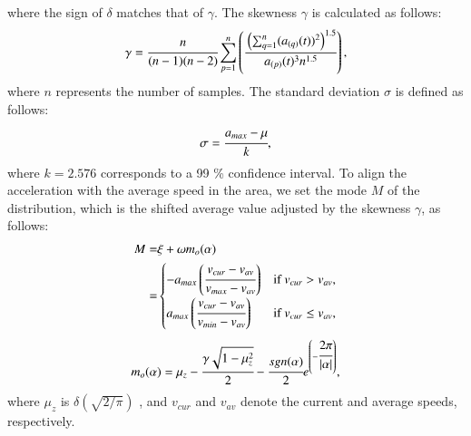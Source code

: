 \documentclass{aims}
\numberwithin{equation}{section}
\begin{document}
where the sign of $\delta$ matches that of $\gamma$.
The skewness $\gamma$ is calculated as follows:
\begin{equation}
        \gamma = \cfrac{n}{(n-1)(n-2)} \sum^{n}_{p=1}\left( \cfrac{\left(\sum^{n}_{q=1}(a_{(q)}(t))^{2} \right)^{1.5}}{a_{(p)}(t)^{3}n^{1.5}} \right),
\end{equation}
where $n$ represents the number of samples.
The standard deviation $\sigma$ is defined as follows:
\begin{equation}
    \sigma = \cfrac{a_{max}-\mu}{k},
\end{equation}
where $k=2.576$ corresponds to a 99 \% confidence interval.
To align the acceleration with the average speed in the area, we set the mode $M$ of the distribution, which is the shifted average value adjusted by the skewness $\gamma$, as follows:\begin{equation}
    \begin{split}
        M=&\xi+\omega m_o(\alpha) \\
         =& \begin{cases}
            - a_{max}\left( \cfrac{v_{cur}-v_{av}}{v_{max}-v_{av}}\right) & \text{if } v_{cur} > v_{av}, \\
            a_{max}\left( \cfrac{v_{cur}-v_{av}}{v_{min}-v_{av}}\right) & \text{if } v_{cur} \leq v_{av},
            \end{cases}
    \end{split}
\end{equation}
\begin{equation}
    m_o(\alpha) = \mu_{z} - \cfrac{\gamma\sqrt{1-\mu_{z}^{2}}}{2} - \cfrac{sgn(\alpha)}{2} e^{\left(-\cfrac{2\pi}{|\alpha|}\right)},
\end{equation}
where $\mu_{z}$ is $\delta(\sqrt{2/\pi})$ \cite{Azzalini}, and $v_{cur}$ and $v_{av}$ denote the current and average speeds, respectively.
\end{document}
